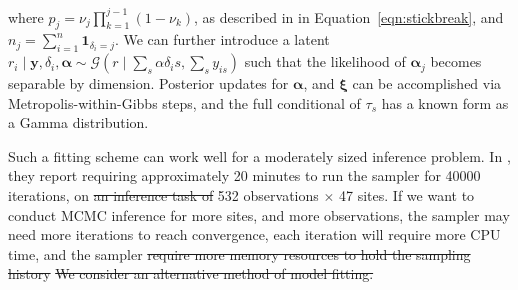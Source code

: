     where $p_j = \nu_j\prod_{k=1}^{j-1}(1 - \nu_k)$,  as described in in 
    Equation~\eqref{eqn:stickbreak}, and $n_j = \sum_{i = 1}^n\bm{1}_{\delta_i = j}$.
    We can further introduce a latent $r_i\mid \bm{y}, \delta_i,\bm{\alpha} \sim 
        \mathcal{G}\left(r\mid \sum_s \alpha{\delta_is},\sum_s y_{is}\right)$ such that the
    likelihood of $\bm{\alpha}_j$ becomes separable by dimension.  Posterior updates 
    for $\bm{\alpha}$, and $\bm{\xi}$ can be accomplished via Metropolis-within-Gibbs steps,
    and the full conditional of $\tau_s$ has a known form as a Gamma distribution.

Such a fitting scheme can work well for a moderately sized inference problem.  In \cite{trubey:pg},
    they report requiring approximately \num{20} minutes to run the sampler for \num{40000} iterations, 
    on \st{an inference task of}  \num{532} observations $\times$ \num{47} sites.  If we want to conduct
    MCMC inference for more sites, and more observations, the sampler may need more iterations to
    reach convergence, each iteration will require more CPU time, and the sampler \st{require more 
    memory resources to hold the sampling history} 
    \st{We consider an alternative method of model fitting.}

